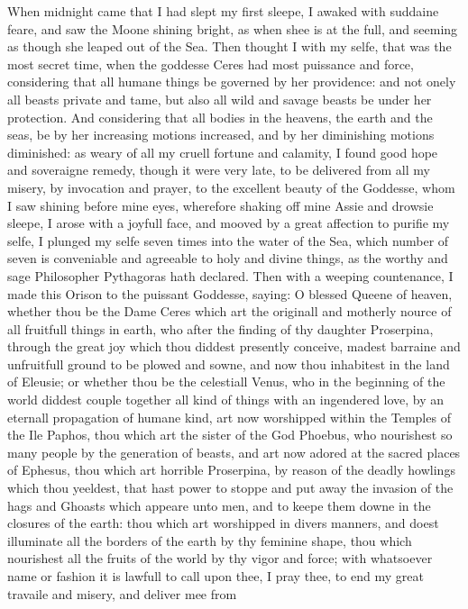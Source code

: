 When midnight came that I had slept my first sleepe, I awaked with suddaine
feare, and saw the Moone shining bright, as when shee is at the full, and
seeming as though she leaped out of the Sea. Then thought I with my selfe, that
was the most secret time, when the goddesse Ceres had most puissance and force,
considering that all humane things be governed by her providence: and not onely
all beasts private and tame, but also all wild and savage beasts be under her
protection. And considering that all bodies in the heavens, the earth and the
seas, be by her increasing motions increased, and by her diminishing motions
diminished: as weary of all my cruell fortune and calamity, I found good hope
and soveraigne remedy, though it were very late, to be delivered from all my
misery, by invocation and prayer, to the excellent beauty of the Goddesse, whom
I saw shining before mine eyes, wherefore shaking off mine Assie and drowsie
sleepe, I arose with a joyfull face, and mooved by a great affection to purifie
my selfe, I plunged my selfe seven times into the water of the Sea, which
number of seven is conveniable and agreeable to holy and divine things, as the
worthy and sage Philosopher Pythagoras hath declared. Then with a weeping
countenance, I made this Orison to the puissant Goddesse, saying: O blessed
Queene of heaven, whether thou be the Dame Ceres which art the originall and
motherly nource of all fruitfull things in earth, who after the finding of thy
daughter Proserpina, through the great joy which thou diddest presently
conceive, madest barraine and unfruitfull ground to be plowed and sowne, and
now thou inhabitest in the land of Eleusie; or whether thou be the celestiall
Venus, who in the beginning of the world diddest couple together all kind of
things with an ingendered love, by an eternall propagation of humane kind, art
now worshipped within the Temples of the Ile Paphos, thou which art the sister
of the God Phoebus, who nourishest so many people by the generation of beasts,
and art now adored at the sacred places of Ephesus, thou which art horrible
Proserpina, by reason of the deadly howlings which thou yeeldest, that hast
power to stoppe and put away the invasion of the hags and Ghoasts which appeare
unto men, and to keepe them downe in the closures of the earth: thou which art
worshipped in divers manners, and doest illuminate all the borders of the earth
by thy feminine shape, thou which nourishest all the fruits of the world by thy
vigor and force; with whatsoever name or fashion it is lawfull to call upon
thee, I pray thee, to end my great travaile and misery, and deliver mee from
